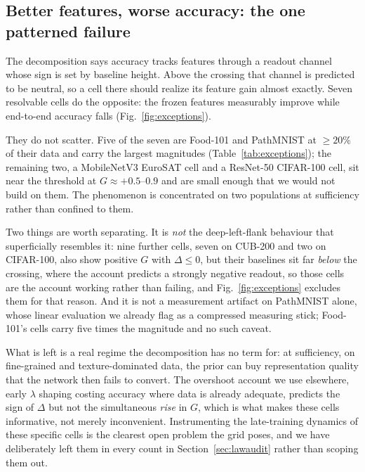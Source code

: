 \subsection{Better features, worse accuracy: the one patterned
failure}\label{sec:exceptions}
The decomposition says accuracy tracks features through a readout channel
whose sign is set by baseline height. Above the crossing that channel is
predicted to be neutral, so a cell there should realize its feature gain
almost exactly. Seven resolvable cells do the opposite: the frozen features
measurably improve while end-to-end accuracy falls
(Fig.~\ref{fig:exceptions}).

They do not scatter. Five of the seven are Food-101 and PathMNIST at
${\geq}20\%$ of their data and carry the largest magnitudes
(Table~\ref{tab:exceptions}); the remaining two, a MobileNetV3 EuroSAT cell
and a ResNet-50 CIFAR-100 cell, sit near the threshold at
$G \approx +0.5$--$0.9$ and are small enough that we would not build on them.
The phenomenon is concentrated on two populations at sufficiency rather than
confined to them.

Two things are worth separating. It is \emph{not} the deep-left-flank
behaviour that superficially resembles it: nine further cells, seven on CUB-200
and two on CIFAR-100, also show positive $G$ with $\Delta \leq 0$, but their
baselines sit far \emph{below} the crossing, where the account predicts a
strongly negative readout, so those cells are the account working rather than
failing, and Fig.~\ref{fig:exceptions} excludes them for that reason. And it
is not a measurement artifact on PathMNIST alone, whose linear evaluation we
already flag as a compressed measuring stick; Food-101's cells carry
five times the magnitude and no such caveat.

What is left is a real regime the decomposition has no term for: at
sufficiency, on fine-grained and texture-dominated data, the prior can buy
representation quality that the network then fails to convert. The
overshoot account we use elsewhere, early $\lambda$ shaping costing accuracy
where data is already adequate, predicts the sign of $\Delta$
but not the simultaneous \emph{rise} in $G$, which is what makes these cells informative, not merely inconvenient. Instrumenting the
late-training dynamics of these specific cells is the clearest open problem
the grid poses, and we have deliberately left them in every count in
Section~\ref{sec:lawaudit} rather than scoping them out.

